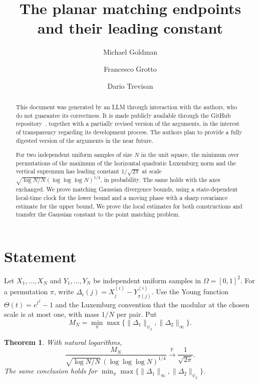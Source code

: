\documentclass[11pt]{article}
\title{The planar matching endpoints and their leading constant}
\author{Michael Goldman \and Francesco Grotto \and Dario Trevisan}
\date{}
\newenvironment{aiuse}
  {\renewcommand{\abstractname}{AI use}\begin{abstract}}
  {\end{abstract}}
\newtheorem{theorem}{Theorem}
\newcommand{\1}{\mathbf{1}}
\numberwithin{equation}{section}
\begin{document}
\maketitle

\begin{aiuse}
This document was generated by an LLM through interaction with the authors,
who do not guarantee its correctness. It is made publicly available through
the GitHub repository~\cite{umc:repository}, together with a partially
revised version of the arguments, in the interest of transparency regarding
its development process. The authors plan to provide a fully digested
version of the arguments in the near future.
\end{aiuse}

\begin{abstract}
For two independent uniform samples of size \(N\) in the unit
square, the minimum over permutations of the maximum of the
horizontal quadratic Luxemburg norm and the vertical supremum
has leading constant \(1/\sqrt{2\pi}\) at scale
\(\sqrt{\log N/N}(\log\log\log N)^{1/4}\), in probability.
The same holds with the axes exchanged. We prove matching
Gaussian divergence bounds, using a state-dependent local-time clock
for the lower bound and a moving phase with a sharp covariance estimate
for the upper bound. We prove the local estimates for both constructions
and transfer the Gaussian constant to the point matching problem.
\end{abstract}

\section{Statement}

Let \(X_1,\ldots,X_N\) and \(Y_1,\ldots,Y_N\) be independent
uniform samples in \(\Omega=[0,1]^2\).
For a permutation \(\pi\), write
\(\Delta_i(j)=X_j^{(i)}-Y_{\pi(j)}^{(i)}\).
Use the Young function \(\Theta(t)=e^{t^2}-1\) and the
Luxemburg convention that the modular at the chosen scale
is at most one, with mass \(1/N\) per pair. Put
\[
 M_N=\min_\pi\max\{\|\Delta_1\|_{\psi_2},
                         \|\Delta_2\|_\infty\}.
\]

\begin{theorem}\label{thm:main}
With natural logarithms,
\[
 \frac{M_N}{\sqrt{\log N/N}\,(\log\log\log N)^{1/4}}
 \xrightarrow{\mathbb P}\frac{1}{\sqrt{2\pi}} .
\]
The same conclusion holds for
\(\min_\pi\max\{\|\Delta_1\|_\infty,\|\Delta_2\|_{\psi_2}\}\).
\end{theorem}
\end{document}
